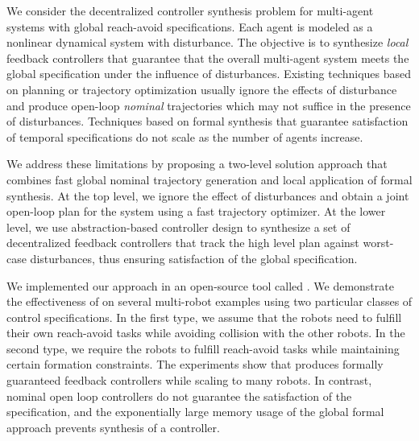 
We consider the decentralized controller synthesis problem for multi-agent systems with global reach-avoid specifications.
Each agent is modeled as a nonlinear dynamical system with disturbance. The objective is to synthesize \emph{local} feedback controllers that guarantee that the overall multi-agent system meets the global specification under the influence of disturbances.
%
Existing techniques based on planning or trajectory optimization usually ignore the effects of disturbance and produce open-loop
\emph{nominal} trajectories which may not suffice in the presence of disturbances.
Techniques based on formal synthesis that guarantee satisfaction of temporal specifications do not scale as the number of agents increase.

We address these limitations by proposing a two-level solution approach that combines fast global nominal trajectory generation and local application of formal synthesis.
At the top level, we ignore the effect of disturbances and obtain a joint open-loop plan for the system using a fast trajectory optimizer.
At the lower level, we use abstraction-based controller design to synthesize a set of decentralized feedback controllers 
that track the high level plan against worst-case disturbances, thus ensuring satisfaction of the global specification.

We implemented our approach in an open-source tool called \tool.
We demonstrate the effectiveness of \tool on several multi-robot examples using two particular classes of control specifications.
In the first type, we assume that the robots need to fulfill their own reach-avoid tasks while avoiding collision with the other robots.
In the second type, we require the robots to fulfill reach-avoid tasks while maintaining certain formation constraints.
The experiments show that \tool produces formally guaranteed feedback controllers while scaling to many robots.
In contrast, nominal open loop controllers do not guarantee the satisfaction of the specification, and the exponentially large memory usage of the global formal approach prevents synthesis of a controller.
